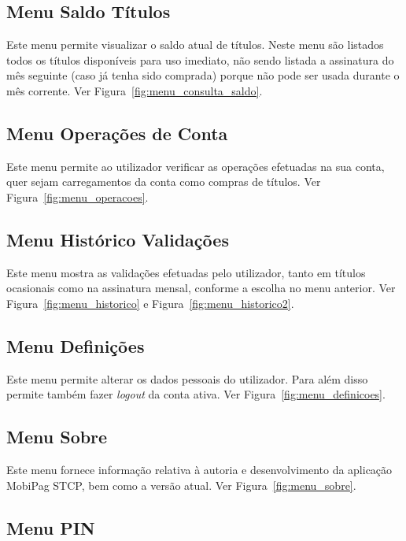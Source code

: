 \subsection{Menu Saldo Títulos}

Este menu permite visualizar o saldo atual de títulos. Neste menu são listados todos os títulos disponíveis para uso imediato, não sendo listada a assinatura do mês seguinte (caso já tenha sido comprada) porque não pode ser usada durante o mês corrente. Ver Figura~\ref{fig:menu_consulta_saldo}.

\subsection{Menu Operações de Conta}

Este menu permite ao utilizador verificar as operações efetuadas na sua conta, quer sejam carregamentos da conta como compras de títulos. Ver Figura~\ref{fig:menu_operacoes}.

\subsection{Menu Histórico Validações}

Este menu mostra as validações efetuadas pelo utilizador, tanto em títulos ocasionais como na assinatura mensal, conforme a escolha no menu anterior. Ver Figura~\ref{fig:menu_historico} e Figura~\ref{fig:menu_historico2}.

\subsection{Menu Definições}

Este menu permite alterar os dados pessoais do utilizador. Para além disso permite também fazer \emph{logout} da conta ativa. Ver Figura~\ref{fig:menu_definicoes}.

\subsection{Menu Sobre}

Este menu fornece informação relativa à autoria e desenvolvimento da aplicação MobiPag STCP, bem como a versão atual. Ver Figura~\ref{fig:menu_sobre}.

\subsection{Menu PIN}

